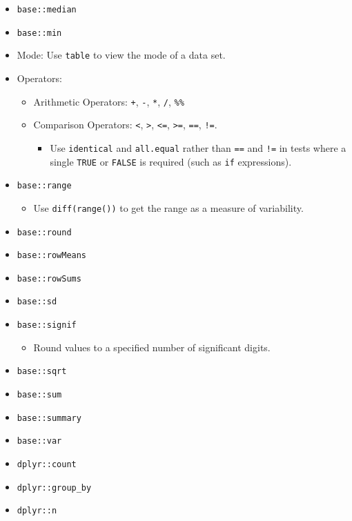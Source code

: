 \documentclass[
]{book}
\providecommand{\tightlist}{%
  \setlength{\itemsep}{0pt}\setlength{\parskip}{0pt}}
\begin{document}
\begin{itemize}
\tightlist
\item
  \texttt{base::median}
\item
  \texttt{base::min}
\item
  Mode: Use \texttt{table} to view the mode of a data set.
\item
  Operators:

  \begin{itemize}
  \tightlist
  \item
    Arithmetic Operators: \texttt{+}, \texttt{-}, \texttt{*}, \texttt{/}, \texttt{\%\%}
  \item
    Comparison Operators: \texttt{\textless{}}, \texttt{\textgreater{}}, \texttt{\textless{}=}, \texttt{\textgreater{}=}, \texttt{==}, \texttt{!=}.

    \begin{itemize}
    \tightlist
    \item
      Use \texttt{identical} and \texttt{all.equal} rather than \texttt{==} and \texttt{!=} in tests where a single \texttt{TRUE} or \texttt{FALSE} is required (such as \texttt{if} expressions).
    \end{itemize}
  \end{itemize}
\item
  \texttt{base::range}

  \begin{itemize}
  \tightlist
  \item
    Use \texttt{diff(range())} to get the range as a measure of variability.
  \end{itemize}
\item
  \texttt{base::round}
\item
  \texttt{base::rowMeans}
\item
  \texttt{base::rowSums}
\item
  \texttt{base::sd}
\item
  \texttt{base::signif}

  \begin{itemize}
  \tightlist
  \item
    Round values to a specified number of significant digits.
  \end{itemize}
\item
  \texttt{base::sqrt}
\item
  \texttt{base::sum}
\item
  \texttt{base::summary}
\item
  \texttt{base::var}
\item
  \texttt{dplyr::count}
\item
  \texttt{dplyr::group\_by}
\item
  \texttt{dplyr::n}


\end{itemize}
\end{document}

